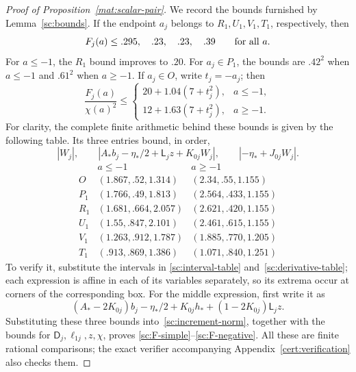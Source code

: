 \begin{proof}[Proof of Proposition~\ref{mat:scalar-pair}]
We record the bounds furnished by Lemma~\ref{sc:bounds}.  If the endpoint
$a_j$ belongs to $R_1,U_1,V_1,T_1$, respectively, then
\begin{equation}\label{sc:F-simple}
 F_j(a)\le .295,\quad .23,\quad .23,\quad .39
 \qquad\hbox{for all }a.
\end{equation}
For $a\le-1$, the $R_1$ bound improves to $.20$.
For $a_j\in P_1$, the bounds are $.42^2$ when $a\le-1$ and $.61^2$
when $a\ge-1$.  If $a_j\in O$, write $t_j=-a_j$; then
\begin{equation}\label{sc:F-negative}
 \frac{F_j(a)}{\chi(a)^2}\le
 \begin{cases}
 20+1.04(7+t_j^2),&a\le-1,\\
 12+1.63(7+t_j^2),&a\ge-1.
 \end{cases}
\end{equation}
For clarity, the complete finite arithmetic behind these bounds is given
by the following table.  Its three entries bound, in order,
\[
 |W_j|,\qquad
 |A_*b_j-\eta_*/2+\mathsf L_jz+K_{0j}W_j|,\qquad
 |-\eta_*+J_{0j}W_j|.
\]
\begin{equation}\label{sc:substitution-table}
\begin{array}{c|cc}
 &a\le-1&a\ge-1\\\hline
 O&(1.867,.52,1.314)&(2.34,.55,1.155)\\
 P_1&(1.766,.49,1.813)&(2.564,.433,1.155)\\
 R_1&(1.681,.664,2.057)&(2.621,.420,1.155)\\
 U_1&(1.55,.847,2.101)&(2.461,.615,1.155)\\
 V_1&(1.263,.912,1.787)&(1.885,.770,1.205)\\
 T_1&(.913,.869,1.386)&(1.071,.840,1.251)
\end{array}
\end{equation}
To verify it, substitute the intervals in
\eqref{sc:interval-table} and~\eqref{sc:derivative-table}; each expression
is affine in each of its variables separately, so its extrema occur at
corners of the corresponding box.  For the middle expression, first write
it as
\[
 (A_*-2K_{0j})b_j-\eta_*/2+K_{0j}h_*+
 (1-2K_{0j})\mathsf L_jz.
\]
Substituting these three bounds into~\eqref{sc:increment-norm}, together
with the bounds for $\mathsf D_j,\ell_{1j},z,\chi$, proves
\eqref{sc:F-simple}--\eqref{sc:F-negative}.  All these are finite rational
comparisons; the exact verifier accompanying Appendix~\ref{cert:verification}
also checks them.


\end{proof}
